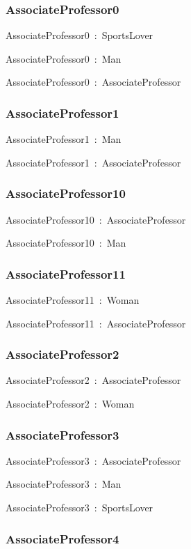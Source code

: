 \documentclass{article}
\begin{document}
\subsubsection*{AssociateProfessor0}

AssociateProfessor0~:~SportsLover

AssociateProfessor0~:~Man

AssociateProfessor0~:~AssociateProfessor

\subsubsection*{AssociateProfessor1}

AssociateProfessor1~:~Man

AssociateProfessor1~:~AssociateProfessor

\subsubsection*{AssociateProfessor10}

AssociateProfessor10~:~AssociateProfessor

AssociateProfessor10~:~Man

\subsubsection*{AssociateProfessor11}

AssociateProfessor11~:~Woman

AssociateProfessor11~:~AssociateProfessor

\subsubsection*{AssociateProfessor2}

AssociateProfessor2~:~AssociateProfessor

AssociateProfessor2~:~Woman

\subsubsection*{AssociateProfessor3}

AssociateProfessor3~:~AssociateProfessor

AssociateProfessor3~:~Man

AssociateProfessor3~:~SportsLover

\subsubsection*{AssociateProfessor4}
\end{document}
